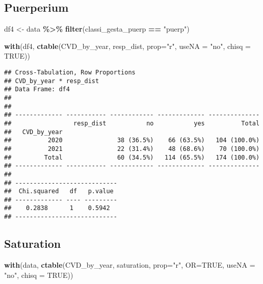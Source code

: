 \documentclass[
]{article}
\newenvironment{Shaded}{\begin{snugshade}}{\end{snugshade}}
\newcommand{\AttributeTok}[1]{\textcolor[rgb]{0.13,0.29,0.53}{#1}}
\newcommand{\ConstantTok}[1]{\textcolor[rgb]{0.56,0.35,0.01}{#1}}
\newcommand{\FunctionTok}[1]{\textcolor[rgb]{0.13,0.29,0.53}{\textbf{#1}}}
\newcommand{\NormalTok}[1]{#1}
\newcommand{\OtherTok}[1]{\textcolor[rgb]{0.56,0.35,0.01}{#1}}
\newcommand{\SpecialCharTok}[1]{\textcolor[rgb]{0.81,0.36,0.00}{\textbf{#1}}}
\newcommand{\StringTok}[1]{\textcolor[rgb]{0.31,0.60,0.02}{#1}}
\begin{document}
\hypertarget{puerperium-1}{%
\subsection{Puerperium}\label{puerperium-1}}

\begin{Shaded}
\begin{Highlighting}[]
\NormalTok{df4 }\OtherTok{\textless{}{-}}\NormalTok{ data }\SpecialCharTok{\%\textgreater{}\%} 
  \FunctionTok{filter}\NormalTok{(classi\_gesta\_puerp }\SpecialCharTok{==} \StringTok{"puerp"}\NormalTok{)}

\FunctionTok{with}\NormalTok{(df4, }\FunctionTok{ctable}\NormalTok{(CVD\_by\_year, resp\_dist, }\AttributeTok{prop=}\StringTok{"r"}\NormalTok{, }\AttributeTok{useNA =} \StringTok{"no"}\NormalTok{, }\AttributeTok{chisq =} \ConstantTok{TRUE}\NormalTok{))}
\end{Highlighting}
\end{Shaded}

\begin{verbatim}
## Cross-Tabulation, Row Proportions  
## CVD_by_year * resp_dist  
## Data Frame: df4  
## 
## 
## ------------- ----------- ------------ ------------- --------------
##                 resp_dist           no           yes          Total
##   CVD_by_year                                                      
##          2020               38 (36.5%)    66 (63.5%)   104 (100.0%)
##          2021               22 (31.4%)    48 (68.6%)    70 (100.0%)
##         Total               60 (34.5%)   114 (65.5%)   174 (100.0%)
## ------------- ----------- ------------ ------------- --------------
## 
## ----------------------------
##  Chi.squared   df   p.value 
## ------------- ---- ---------
##    0.2838      1    0.5942  
## ----------------------------
\end{verbatim}

\hypertarget{saturation}{%
\subsection{Saturation}\label{saturation}}

\begin{Shaded}
\begin{Highlighting}[]
\FunctionTok{with}\NormalTok{(data, }\FunctionTok{ctable}\NormalTok{(CVD\_by\_year, saturation, }\AttributeTok{prop=}\StringTok{"r"}\NormalTok{, }\AttributeTok{OR=}\ConstantTok{TRUE}\NormalTok{, }\AttributeTok{useNA =} \StringTok{"no"}\NormalTok{, }\AttributeTok{chisq =} \ConstantTok{TRUE}\NormalTok{))}
\end{Highlighting}
\end{Shaded}
\end{document}
